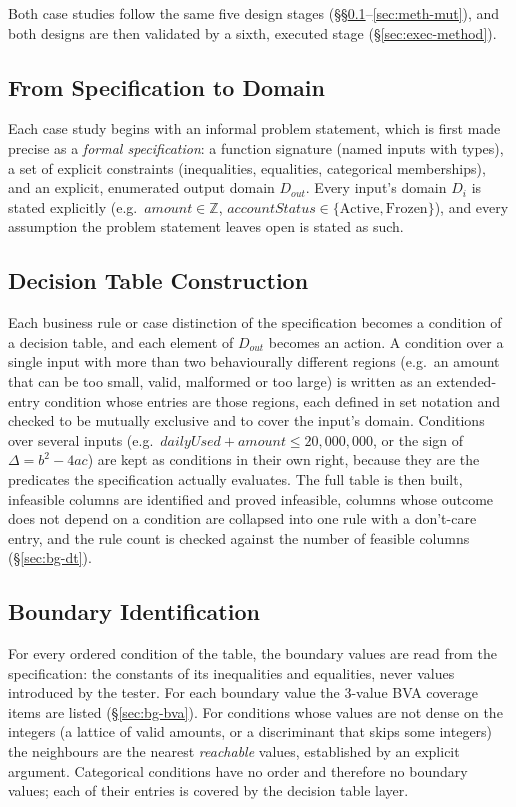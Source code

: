 \documentclass[11pt,a4paper]{article}
\begin{document}
Both case studies follow the same five design stages
(\S\S\ref{sec:meth-spec}--\ref{sec:meth-mut}), and both designs are then
validated by a sixth, executed stage (\S\ref{sec:exec-method}).

\subsection{From Specification to Domain}
\label{sec:meth-spec}
Each case study begins with an informal problem statement, which is first
made precise as a \emph{formal specification}: a function signature (named
inputs with types), a set of explicit constraints (inequalities, equalities,
categorical memberships), and an explicit, enumerated output domain
\(D_{out}\). Every input's domain \(D_i\) is stated explicitly (e.g.\
\(\mathit{amount}\in\mathbb{Z}\),
\(\mathit{accountStatus}\in\{\mathrm{Active},\mathrm{Frozen}\}\)), and every
assumption the problem statement leaves open is stated as such.

\subsection{Decision Table Construction}
\label{sec:meth-dt}
Each business rule or case distinction of the specification becomes a
condition of a decision table, and each element of \(D_{out}\) becomes an
action. A condition over a single input with more than two behaviourally
different regions (e.g.\ an amount that can be too small, valid, malformed
or too large) is written as an extended-entry condition whose entries are
those regions, each defined in set notation and checked to be mutually
exclusive and to cover the input's domain. Conditions over several inputs
(e.g.\ \(\mathit{dailyUsed}+\mathit{amount}\le 20{,}000{,}000\), or the
sign of \(\Delta=b^2-4ac\)) are kept as conditions in their own right,
because they are the predicates the specification actually evaluates. The
full table is then built, infeasible columns are identified and proved
infeasible, columns whose outcome does not depend on a condition are
collapsed into one rule with a don't-care entry, and the rule count is
checked against the number of feasible columns (\S\ref{sec:bg-dt}).

\subsection{Boundary Identification}
\label{sec:meth-bva}
For every ordered condition of the table, the boundary values are read from
the specification: the constants of its inequalities and equalities, never
values introduced by the tester. For each boundary value the 3-value BVA
coverage items are listed (\S\ref{sec:bg-bva}). For conditions whose values
are not dense on the integers (a lattice of valid amounts, or a discriminant
that skips some integers) the neighbours are the nearest \emph{reachable}
values, established by an explicit argument. Categorical conditions have no
order and therefore no boundary values; each of their entries is covered by
the decision table layer.
\end{document}
